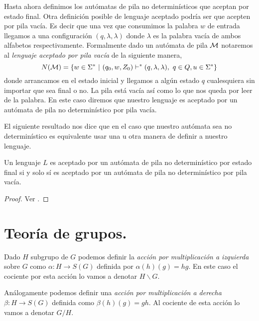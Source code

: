 \documentclass[tesis.tex]{subfiles}
\begin{document}
Hasta ahora definimos los autómatas de pila no determinísticos que aceptan por estado final. Otra definición posible de lenguaje aceptado podría ser que acepten por pila vacía. 
Es decir que una vez que consumimos la palabra $w$ de entrada llegamos a una configuración $(q, \lambda, \lambda)$ donde $\lambda$ es la palabra vacía de ambos alfabetos respectivamente. Formalmente dado un autómata de pila $\cal M$  notaremos al \emph{lenguaje aceptado por pila vacía} de la siguiente manera,
\begin{equation*}
	N({\cal M}) = \{ w \in \Sigma^* \ | \ (q_0,w,Z_0) \vdash^* (q, \lambda, \lambda), \ q \in Q, u \in \Sigma^*    \}
\end{equation*}
donde arrancamos en el estado inicial y llegamos a algún estado $q$ cualesquiera sin importar que sea final o no.
La pila está vacía así como lo que nos queda por leer de la palabra. 
En este caso diremos que nuestro lenguaje es aceptado por un autómata de pila no determinístico por pila vacía.


El siguiente resultado nos dice que en el caso que nuestro autómata sea no determinístico es equivalente usar una u otra manera de definir a nuestro lenguaje.

\medskip
\begin{teo}
	Un lenguaje $L$ es aceptado por un autómata de pila no determinístico por estado final si y solo sí es aceptado por un autómata de pila no determinístico por pila vacía.
\end{teo}

\begin{proof}
	Ver \cite{hopcraft-ullman}.
\end{proof}




\section{Teoría de grupos.}\label{secc_teo_grp}



\begin{deff}
	Dado $H$ subgrupo de $G$ podemos definir la \emph{acción por multiplicación a izquierda} sobre $G$ como $\alpha: H \to S(G)$ definida por $\alpha(h)(g) = hg$.
	En este caso el cociente por esta acción lo vamos a denotar $H \backslash G $.
	
	Análogamente podemos definir una \emph{acción por multiplicación a derecha} $\beta:H \to S(G)$ definida como $\beta(h)(g) = gh$.
	Al cociente de esta acción lo vamos a denotar $G/H$.
\end{deff}
\end{document}
